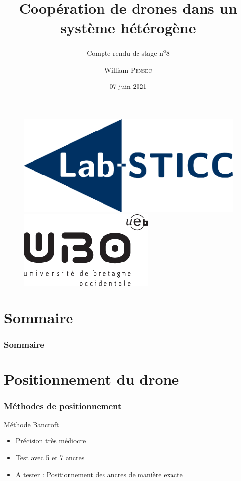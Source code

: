 \documentclass[12pt]{beamer}
\title[Compte rendu de stage n\textsuperscript{o}8]{Coopération de drones dans un système hétérogène}
\subtitle{Compte rendu de stage n\textsuperscript{o}8}
\author{William \textsc{Pensec}}
\institute[Lab-STICC]{Lab-Sticc}
\date{07 juin 2021}
\begin{document}
	\begin{frame}
		\begin{titlepage}
			\begin{figure}[H]
				\centering
				\includegraphics[scale=.15]{labsticc.png}
				\hspace{3cm}
				\includegraphics[scale=.3]{ubo.png}
			\end{figure}
		\end{titlepage}
	\end{frame}
	
	\section*{Sommaire}
	\begin{frame}
		\frametitle{Sommaire}
		\begin{center}
			\tableofcontents
		\end{center}
	\end{frame}
	\section{Positionnement du drone}
	\begin{frame}[allowframebreaks]
    	\frametitle{Méthodes de positionnement}
    	    \begin{block}{Méthode Bancroft}
				\begin{itemize}
    	        [triangle]
				    \item Précision très médiocre
				    \item Test avec 5 et 7 ancres
				    \item A tester : Positionnement des ancres de manière exacte
				\end{itemize}
			\end{block}
	\end{frame}
\end{document}
